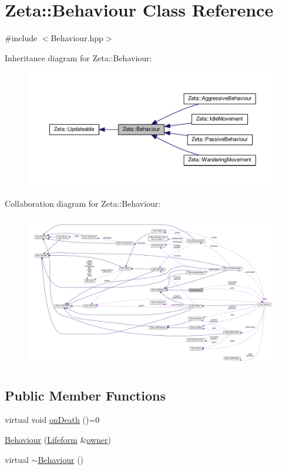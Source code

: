 \hypertarget{classZeta_1_1Behaviour}{\section{Zeta\+:\+:Behaviour Class Reference}
\label{classZeta_1_1Behaviour}
}


{\ttfamily \#include $<$Behaviour.\+hpp$>$}



Inheritance diagram for Zeta\+:\+:Behaviour\+:\nopagebreak
\begin{figure}[H]
\begin{center}
\leavevmode
\includegraphics[width=350pt]{classZeta_1_1Behaviour__inherit__graph}
\end{center}
\end{figure}


Collaboration diagram for Zeta\+:\+:Behaviour\+:
\nopagebreak
\begin{figure}[H]
\begin{center}
\leavevmode
\includegraphics[width=350pt]{classZeta_1_1Behaviour__coll__graph}
\end{center}
\end{figure}
\subsection*{Public Member Functions}
\begin{DoxyCompactItemize}
\item 
virtual void \hyperlink{classZeta_1_1Behaviour_ac8c86b2e91f99441ee2e7de54e7d17d9}{on\+Death} ()=0
\item 
\hyperlink{classZeta_1_1Behaviour_a31a2749e194ed8344ba3fd136a5fa44f}{Behaviour} (\hyperlink{classZeta_1_1Lifeform}{Lifeform} \&\hyperlink{classZeta_1_1Behaviour_ad32d56994e4e09e01ef86bcbb5c85e0a}{owner})
\item 
virtual \hyperlink{classZeta_1_1Behaviour_a1571d412ef383378054ae8a3098d3820}{$\sim$\+Behaviour} ()
\end{DoxyCompactItemize}
